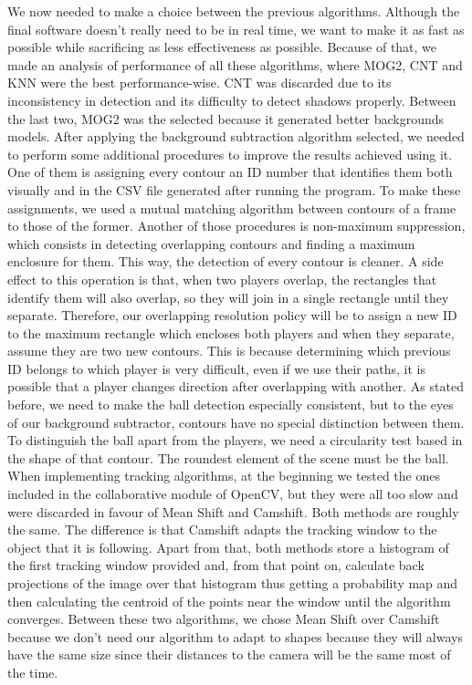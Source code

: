 We now needed to make a choice between the previous algorithms. Although the final software doesn’t really need to be in real time, we want to make it as fast as possible while sacrificing as less effectiveness as possible. Because of that, we made an analysis of performance of all these algorithms, where MOG2, CNT and KNN were the best performance-wise. CNT was discarded due to its inconsistency in detection and its difficulty to detect shadows properly. Between the last two, MOG2 was the selected because it generated better backgrounds models. 
After applying the background subtraction algorithm selected, we needed to perform some additional procedures to improve the results achieved using it. One of them is assigning every contour an ID number that identifies them both visually and in the CSV file generated after running the program. To make these assignments, we used a mutual matching algorithm between contours of a frame to those of the former.
Another of those procedures is non-maximum suppression, which consists in detecting overlapping contours and finding a maximum enclosure for them. This way, the detection of every contour is cleaner. A side effect to this operation is that, when two players overlap, the rectangles that identify them will also overlap, so they will join in a single rectangle until they separate. Therefore, our overlapping resolution policy will be to assign a new ID to the maximum rectangle which encloses both players and when they separate, assume they are two new contours. This is because determining which previous ID belongs to which player is very difficult, even if we use their paths, it is possible that a player changes direction after overlapping with another.
As stated before, we need to make the ball detection especially consistent, but to the eyes of our background subtractor, contours have no special distinction between them. To distinguish the ball apart from the players, we need a circularity test based in the shape of that contour. The roundest element of the scene must be the ball.
When implementing tracking algorithms, at the beginning we tested the ones included in the collaborative module of OpenCV, but they were all too slow and were discarded in favour of Mean Shift and Camshift. 
Both methods are roughly the same. The difference is that Camshift adapts the tracking window to the object that it is following. Apart from that, both methods store a histogram of the first tracking window provided and, from that point on, calculate back projections of the image over that histogram thus getting a probability map and then calculating the centroid of the points near the window until the algorithm converges. Between these two algorithms, we chose Mean Shift over Camshift because we don’t need our algorithm to adapt to shapes because they will always have the same size since their distances to the camera will be the same most of the time.

